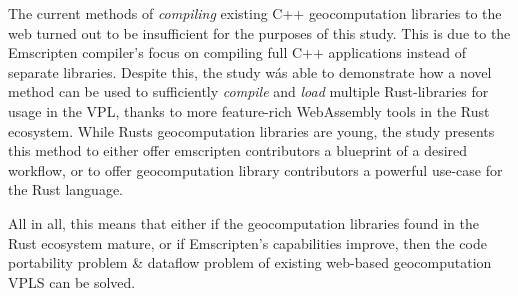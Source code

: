 The current methods of \emph{compiling} existing C++ geocomputation libraries to the web turned out to be insufficient for the purposes of this study.  
This is due to the Emscripten compiler's focus on compiling full C++ applications instead of separate libraries. 
Despite this, the study wás able to demonstrate how a novel method can be used to sufficiently \emph{compile} and \emph{load} multiple Rust-libraries for usage in the VPL, thanks to more feature-rich WebAssembly tools in the Rust ecosystem. 
While Rusts geocomputation libraries are young, the study presents this method to either offer emscripten contributors a blueprint of a desired workflow, or to offer geocomputation library contributors a powerful use-case for the Rust language. 

All in all, this means that either if the geocomputation libraries found in the Rust ecosystem mature, or if Emscripten's capabilities improve, then the code portability problem \& dataflow problem of existing web-based geocomputation VPLS can be solved. 




    
    
    
    
    
